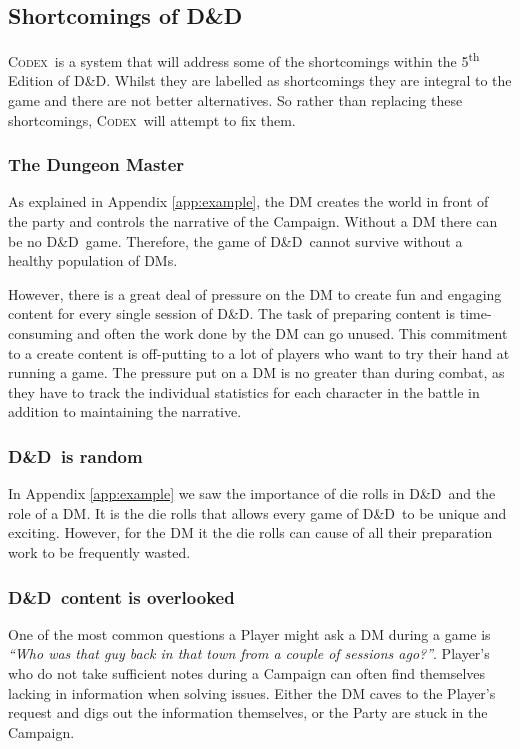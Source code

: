 \documentclass[progress]{cmpreport}
\newcommand{\dnd}{D\&D}
\newcommand{\Codex}{\textsc{Codex}}
\begin{document}
	\subsection{Shortcomings of \dnd} \label{sec:shortcomings}
	\Codex \ is a system that will address some of the shortcomings within the 5\textsuperscript{th} Edition of \dnd. Whilst they are labelled as shortcomings they are integral to the game and there are not better alternatives. So rather than replacing these shortcomings, \Codex \ will attempt to fix them.
	
		\subsubsection{The Dungeon Master} \label{sec:DM}
		As explained in Appendix \ref{app:example}, the DM creates the world in front of the party and controls the narrative of the Campaign. Without a DM there can be no \dnd \ game. Therefore, the game of \dnd \ cannot survive without a healthy population of DMs.
		
		However, there is a great deal of pressure on the DM to create fun and engaging content for every single session of \dnd. The task of preparing content is time-consuming and often the work done by the DM can go unused. This commitment to a create content is off-putting to a lot of players who want to try their hand at running a game. The pressure put on a DM is no greater than during combat, as they have to track the individual statistics for each character in the battle in addition to maintaining the narrative.

		\subsubsection{\dnd \ is random} \label{sec:rand}
		In Appendix \ref{app:example} we saw the importance of die rolls in \dnd \ and the role of a DM. It is the die rolls that allows every game of \dnd \ to be unique and exciting. However, for the DM it the die rolls can cause of all their preparation work to be frequently wasted.
		
		\subsubsection{\dnd \ content is overlooked} \label{sec:overlooked}
		One of the most common questions a Player might ask a DM during a game is \emph{``Who was that guy back in that town from a couple of sessions ago?''}. Player's who do not take sufficient notes during a Campaign can often find themselves lacking in information when solving issues. Either the DM caves to the Player's request and digs out the information themselves, or the Party are stuck in the Campaign. 
\end{document}
